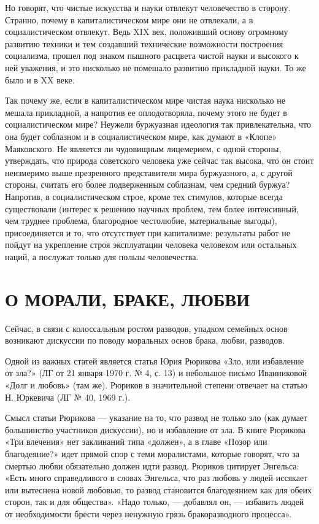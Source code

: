 Но говорят, что чистые искусства и науки отвлекут человечество в
сторону. Странно, почему в капиталистическом мире они не отвлекали, а
в социалистическом отвлекут. Ведь XIX век, положивший основу огромному
развитию техники и тем создавший технические возможности построения
социализма, прошел под знаком пышного расцвета чистой науки и высокого
к ней уважения, и это нисколько не помешало развитию прикладной науки.
То же было и в XX веке.

Так почему же, если в капиталистическом мире чистая наука нисколько не
мешала прикладной, а напротив ее оплодотворяла, почему этого не будет
в социалистическом мире? Неужели буржуазная идеология так
привлекательна, что она будет соблазном и в социалистическом мире, как
думают в «Клопе» Маяковского. Не является ли чудовищным лицемерием, с
одной стороны, утверждать, что природа советского человека уже сейчас
так высока, что он стоит неизмеримо выше презренного представителя
мира буржуазного, а, с другой стороны, считать его более подверженным
соблазнам, чем средний буржуа? Напротив, в социалистическом строе,
кроме тех стимулов, которые всегда существовали (интерес к решению
научных проблем, тем более интенсивный, чем труднее проблема,
благородное честолюбие, материальные выгоды), присоединяется и то, что
отсутствует при капитализме: результаты работ не пойдут на укрепление
строя эксплуатации человека человеком или остальных наций, а послужат
только для пользы человечества.

\section{О МОРАЛИ, БРАКЕ, ЛЮБВИ}

Сейчас, в связи с колоссальным ростом разводов, упадком семейных основ
возникают дискуссии по поводу моральных основ брака, любви, разводов.

Одной из важных статей является статья Юрия Рюрикова «Зло, или
избавление от зла?» (ЛГ от 21 января 1970 г. № 4, с. 13) и небольшое
письмо Иванниковой «Долг и любовь» (там же). Рюриков в значительной
степени отвечает на статью Н. Юркевича (ЛГ № 40, 1969 г.).

Смысл статьи Рюрикова --- указание на то, что развод не только зло
(как думает большинство участников дискуссии), но и избавление от зла.
В книге Рюрикова «Три влечения» нет заклинаний типа «должен», а в
главе «Позор или благодеяние?» идет прямой спор с теми моралистами,
которые говорят, что за смертью любви обязательно должен идти развод.
Рюриков цитирует Энгельса: «Есть много справедливого в словах
Энгельса, что раз любовь у людей иссякает или вытеснена новой любовью,
то развод становится благодеянием как для обеих сторон, так и для
общества». «Надо только, --- добавлял он, --- избавить людей от
необходимости брести через ненужную грязь бракоразводного процесса».

